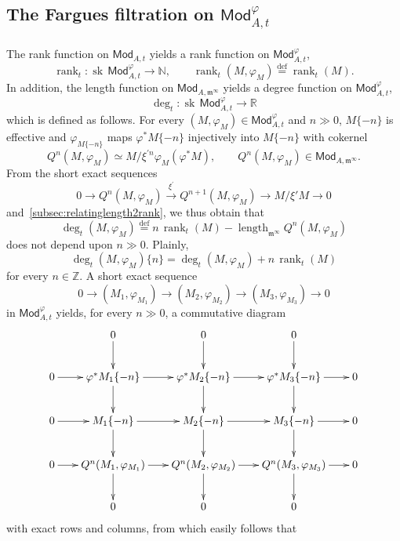 \documentclass[11pt]{article}
\theoremstyle{definition}
\numberwithin{equation}{section}
\numberwithin{figure}{section}
\numberwithin{table}{section}
\newcommand{\Mod}{\mathsf{Mod}}
\DeclareMathOperator{\length}{length}
\DeclareMathOperator{\rank}{rank}
\DeclareMathOperator{\sk}{sk}
\newcommand{\eqd}{\stackrel{\mathrm{def}}{=}}
\begin{document}
\subsection{The Fargues filtration on \texorpdfstring{$\Mod_{A,t}^{\varphi}$}{ModA,tphi}}\label{subsec:FarguesOnModAt}

\subsubsection{}

The rank function on $\Mod_{A,t}$ yields a rank function on $\Mod_{A,t}^{\varphi}$,
\[
\rank_{t}:\sk\,\Mod_{A,t}^{\varphi}\rightarrow\mathbb{N},\qquad\rank_{t}(M,\varphi_{M})\eqd\rank_{t}(M).
\]
In addition, the length function on $\Mod_{A,\mathfrak{m}^{\infty}}$ yields a degree function on $\Mod_{A,t}^{\varphi}$,
\[
\deg_{t}:\sk\,\Mod_{A,t}^{\varphi}\rightarrow\mathbb{R}
\]
which is defined as follows. For every $(M,\varphi_{M})\in\Mod_{A,t}^{\varphi}$ and $n\gg0$, $M\{-n\}$ is effective and $\varphi_{M\{-n\}}$ maps $\varphi^{\ast}M\{-n\}$ injectively into $M\{-n\}$ with cokernel
\[
Q^{n}(M,\varphi_{M})\simeq M/\xi^{\prime n}\varphi_{M}\left(\varphi^{\ast}M\right),\qquad Q^{n}(M,\varphi_{M})\in\Mod_{A,\mathfrak{m}^{\infty}}.
\]
From the short exact sequences
\[
0\rightarrow Q^{n}(M,\varphi_{M})\stackrel{\xi^{\prime}}{\longrightarrow}Q^{n+1}(M,\varphi_{M})\rightarrow M/\xi'M\rightarrow0
\]
and~\ref{subsec:relatinglength2rank}, we thus obtain that
\[
\deg_{t}(M,\varphi_{M})\eqd n\,\rank_{t}(M)-\length_{\mathfrak{m}^{\infty}}Q^{n}(M,\varphi_{M})
\]
does not depend upon $n\gg0$. Plainly,
\[
\deg_{t}(M,\varphi_{M})\{n\}=\deg_{t}(M,\varphi_{M})+n\,\rank_{t}(M)
\]
for every $n\in\mathbb{Z}$. A short exact sequence
\[
0\rightarrow(M_{1},\varphi_{M_{1}})\rightarrow(M_{2},\varphi_{M_{2}})\rightarrow(M_{3},\varphi_{M_{3}})\rightarrow0
\]
in $\Mod_{A,t}^{\varphi}$ yields, for every $n\gg0$, a commutative diagram
\[
\xymatrix@C=1.5pc{ & 0\ar[d] & 0\ar[d] & 0\ar[d]\\
0\ar[r] & \varphi^{\ast}M_{1}\{-n\}\ar[r]\ar[d] & \varphi^{\ast}M_{2}\{-n\}\ar[r]\ar[d] & \varphi^{\ast}M_{3}\{-n\}\ar[r]\ar[d] & 0\\
0\ar[r] & M_{1}\{-n\}\ar[r]\ar[d] & M_{2}\{-n\}\ar[r]\ar[d] & M_{3}\{-n\}\ar[r]\ar[d] & 0\\
0\ar[r] & Q^{n}(M_{1},\varphi_{M_{1}})\ar[r]\ar[d] & Q^{n}(M_{2},\varphi_{M_{2}})\ar[r]\ar[d] & Q^{n}(M_{3},\varphi_{M_{3}})\ar[r]\ar[d] & 0\\
& 0 & 0 & 0 }
\]
with exact rows and columns, from which easily follows that
\end{document}
